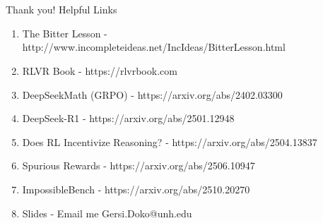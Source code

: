 



\frame{\titlepage}










\section*{}

\begin{frame}{Thank you!}
  Helpful Links
  \vfill
  {\small
  \begin{enumerate}
    \item The Bitter Lesson - http://www.incompleteideas.net/IncIdeas/BitterLesson.html
    \item RLVR Book - https://rlvrbook.com
    \item DeepSeekMath (GRPO) - https://arxiv.org/abs/2402.03300
    \item DeepSeek-R1 - https://arxiv.org/abs/2501.12948
    \item Does RL Incentivize Reasoning? - https://arxiv.org/abs/2504.13837
    \item Spurious Rewards - https://arxiv.org/abs/2506.10947
    \item ImpossibleBench - https://arxiv.org/abs/2510.20270
    \item Slides - Email me Gersi.Doko@unh.edu
  \end{enumerate}
  }
  \vfill
\end{frame}


